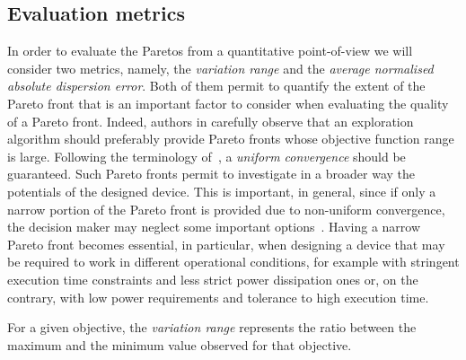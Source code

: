 
\subsection{Evaluation metrics}
In order to evaluate the Paretos from a quantitative point-of-view we
will consider two metrics, namely, the \emph{variation range} and the
\emph{average normalised absolute dispersion error}. Both of them permit to quantify the extent of the Pareto front that is an important factor to consider when evaluating the quality of a Pareto front. Indeed, authors in \cite{zitzler_ec00,weise2012evolutionary} carefully observe that an exploration algorithm should preferably provide Pareto fronts whose objective function range is large. Following the terminology of~\cite{weise2012evolutionary}, a \emph{uniform convergence} should be guaranteed.
Such Pareto fronts permit to investigate in a broader way the potentials of the designed device. This is important, in general, since if only a narrow portion of the Pareto front is provided due to non-uniform convergence, the decision maker may neglect some important options~\cite{weise2012evolutionary}. Having a narrow Pareto front becomes essential, in particular, when designing a device that may be required to work in different operational conditions, for example with stringent execution time constraints and less strict power dissipation ones or, on the contrary, with low power requirements and tolerance to high execution time.

For a given objective, the \emph{variation range} represents the ratio between the maximum and the minimum value observed for that objective.


